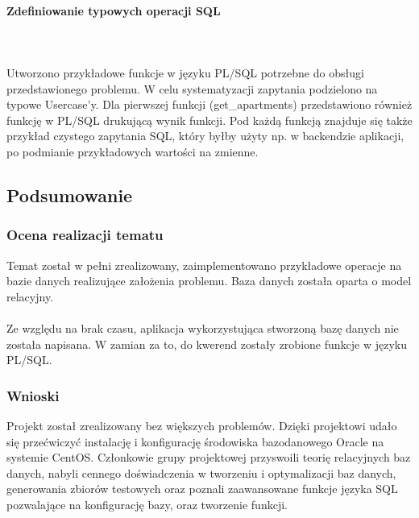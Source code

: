 \documentclass[polish, 11pt]{article}
\begin{document}
		    \paragraph{Zdefiniowanie typowych operacji SQL}\mbox{}\\\\
                Utworzono przykładowe funkcje w języku PL/SQL potrzebne do obsługi przedstawionego problemu.
                W celu systematyzacji zapytania podzielono na typowe Usercase'y.
                Dla pierwszej funkcji (get\_apartments) przedstawiono również funkcję w PL/SQL drukującą wynik funkcji.
                Pod każdą funkcją znajduje się także przykład czystego zapytania SQL, który byłby
				użyty np. w backendzie aplikacji, po podmianie przykładowych wartości na zmienne.
				
				

    \subsection{Podsumowanie}
	    \subsubsection{Ocena realizacji tematu}
		    Temat został w pełni zrealizowany, zaimplementowano przykładowe operacje na bazie danych realizujące założenia problemu.
		    Baza danych została oparta o model relacyjny.\\\\
		    Ze względu na brak czasu, aplikacja wykorzystująca stworzoną bazę danych nie została napisana. W zamian za to, do kwerend zostały zrobione
		    funkcje w języku PL/SQL.
	    
		\subsubsection{Wnioski}
			Projekt został zrealizowany bez większych problemów. Dzięki projektowi udało się przećwiczyć instalację i konfigurację środowiska
			bazodanowego Oracle na systemie CentOS. Członkowie grupy projektowej przyswoili teorię relacyjnych baz danych, nabyli cennego
			doświadczenia w tworzeniu i optymalizacji baz danych, generowania zbiorów testowych oraz poznali zaawansowane funkcje języka SQL 
			pozwalające na konfigurację bazy, oraz tworzenie funkcji.
\end{document}
